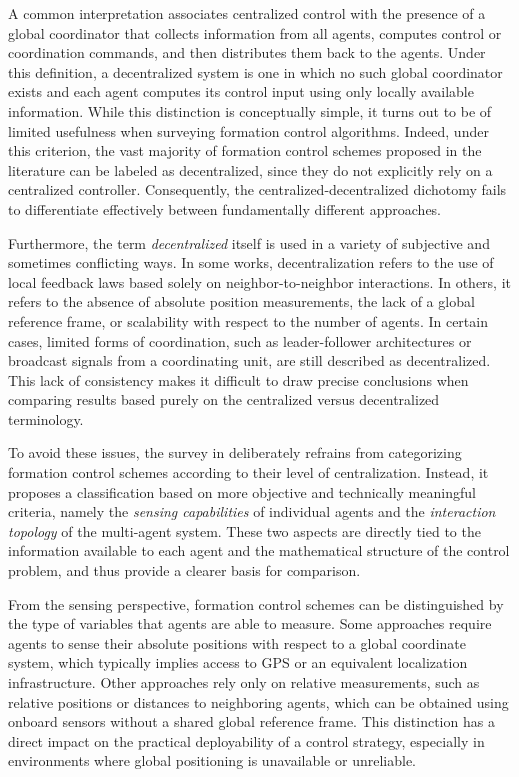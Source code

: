 A common interpretation associates centralized control with the presence of a global coordinator that collects information from all agents, computes control or coordination commands, and then distributes them back to the agents. Under this definition, a decentralized system is one in which no such global coordinator exists and each agent computes its control input using only locally available information. While this distinction is conceptually simple, it turns out to be of limited usefulness when surveying formation control algorithms. Indeed, under this criterion, the vast majority of formation control schemes proposed in the literature can be labeled as decentralized, since they do not explicitly rely on a centralized controller. Consequently, the centralized-decentralized dichotomy fails to differentiate effectively between fundamentally different approaches.

Furthermore, the term \emph{decentralized} itself is used in a variety of subjective and sometimes conflicting ways. In some works, decentralization refers to the use of local feedback laws based solely on neighbor-to-neighbor interactions. In others, it refers to the absence of absolute position measurements, the lack of a global reference frame, or scalability with respect to the number of agents. In certain cases, limited forms of coordination, such as leader-follower architectures or broadcast signals from a coordinating unit, are still described as decentralized. This lack of consistency makes it difficult to draw precise conclusions when comparing results based purely on the centralized versus decentralized terminology.

To avoid these issues, the survey in \cite{surver_centralized_decentralized} deliberately refrains from categorizing formation control schemes according to their level of centralization. Instead, it proposes a classification based on more objective and technically meaningful criteria, namely the \emph{sensing capabilities} of individual agents and the \emph{interaction topology} of the multi-agent system. These two aspects are directly tied to the information available to each agent and the mathematical structure of the control problem, and thus provide a clearer basis for comparison.

From the sensing perspective, formation control schemes can be distinguished by the type of variables that agents are able to measure. Some approaches require agents to sense their absolute positions with respect to a global coordinate system, which typically implies access to GPS or an equivalent localization infrastructure. Other approaches rely only on relative measurements, such as relative positions or distances to neighboring agents, which can be obtained using onboard sensors without a shared global reference frame. This distinction has a direct impact on the practical deployability of a control strategy, especially in environments where global positioning is unavailable or unreliable.


